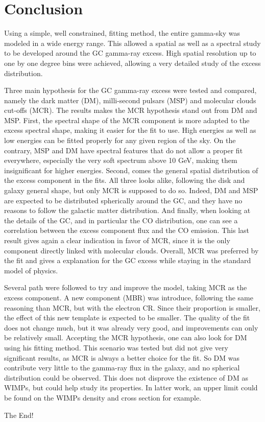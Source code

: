 \chapter{Conclusion}
\label{ch:conclusion}

%
%
%
%
%

Using a simple, well constrained, fitting method, the entire gamma-sky was modeled in a wide energy range. This allowed a spatial as well as a spectral study to be developed around the GC gamma-ray excess. High spatial resolution up to one by one degree bins were achieved, allowing a very detailed study of the excess distribution.

Three main hypothesis for the GC gamma-ray excess were tested and compared, namely the dark matter (DM), milli-second pulsars (MSP) and molecular clouds cut-offs (MCR). The results makes the MCR hypothesis stand out from DM and MSP. First, the spectral shape of the MCR component is more adapted to the excess spectral shape, making it easier for the fit to use. High energies as well as low energies can be fitted properly for any given region of the sky. On the contrary, MSP and DM have spectral features that do not allow a proper fit everywhere, especially the very soft spectrum above 10 GeV, making them insignificant for higher energies. Second, comes the general spatial distribution of the excess component in the fits. All three looks alike, following the disk and galaxy general shape, but only MCR is supposed to do so. Indeed, DM and MSP are expected to be distributed spherically around the GC, and they have no reasons to follow the galactic matter distribution. And finally, when looking at the details of the GC, and in particular the CO distribution, one can see a correlation between the excess component flux and the CO emission. This last result gives again a clear indication in favor of MCR, since it is the only component directly linked with molecular clouds. Overall, MCR was preferred by the fit and gives a explanation for the GC excess while staying in the standard model of physics.

Several path were followed to try and improve the model, taking MCR as the excess component. A new component (MBR) was introduce, following the same reasoning than MCR, but with the electron CR. Since their proportion is smaller, the effect of this new template is expected to be smaller. The quality of the fit does not change much, but it was already very good, and improvements can only be relatively small.
Accepting the MCR hypothesis, one can also look for DM using his fitting method. This scenario was tested but did not give very significant results, as MCR is always a better choice for the fit. So DM was contribute very little to the gamma-ray flux in the galaxy, and no spherical distribution could be observed. This does not disprove the existence of DM as WIMPs, but could help study its properties. In latter work, an upper limit could be found on the WIMPs density and cross section for example.

The End!

